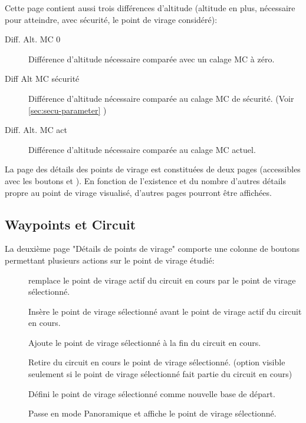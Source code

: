 Cette page contient aussi trois différences d'altitude (altitude en plus, nécessaire pour atteindre, avec sécurité,  le point de virage considéré):
\begin{description}
\item[Diff. Alt. MC 0] Différence d'altitude nécessaire comparée avec un calage MC à zéro.
\item[Diff Alt MC sécurité] Différence d'altitude nécessaire comparée au calage MC de sécurité. (Voir \ref{sec:secu-parameter} )
\item[Diff. Alt. MC act] Différence d'altitude nécessaire comparée au calage MC actuel.
\end{description}

La page des détails des points de virage est constituées de deux pages (accessibles avec les boutons \button{$>$} et \button{$<$} ). En fonction de l'existence et du nombre d'autres détails propre au point de virage visualisé, d'autres pages pourront être affichées.

\subsection*{Waypoints et Circuit}
La deuxième page "Détails de points de virage" comporte une colonne de boutons permettant plusieurs actions sur le point de virage étudié:
\begin{description}
\item[] remplace le point de virage actif du circuit en cours par le point de virage sélectionné.
\item[] Insère le point de virage sélectionné avant le point de virage actif du circuit en cours.
\item[] Ajoute le point de virage sélectionné à la fin du circuit en cours.
\item[] Retire du circuit en cours le point de virage sélectionné. (option visible seulement si le point de virage sélectionné fait partie du circuit en cours)
\item[] Défini le point de virage sélectionné comme nouvelle base de départ.
\item[] Passe en mode Panoramique et affiche le point de virage sélectionné.


\end{description}


